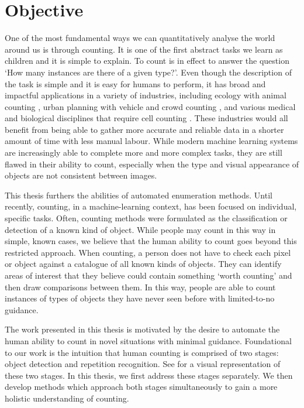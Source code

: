 \documentclass[../thesis.tex]{subfiles}
\begin{document}
\section{Objective}\label{sec__intro__objective}
One of the most fundamental ways we can quantitatively analyse the world around us is through counting. 
It is one of the first abstract tasks we learn as children and it is simple to explain. To count is in effect to answer the question `How many instances are there of a given type?'. 
Even though the description of the task is simple and it is easy for humans to perform, it has broad and impactful applications in a variety of industries, including ecology with animal counting \cite{go2021fine, arteta2016counting}, urban planning with vehicle \cite{arteta2014interactive, Lu18, mundhenk2016large} and crowd counting \cite{wang2011automatic, wang2015deep, marana1997estimation, cao2018scale, barinova2012detection, Lu18}, and various medical and biological disciplines that require cell counting \cite{xie2018microscopy, morelli2021automating}. These industries would all benefit from being able to gather more accurate and reliable data in a shorter amount of time with less manual labour.
While modern machine learning systems are increasingly able to complete more and more complex tasks, they are still flawed in their ability to count, especially when the type and visual appearance of objects are not consistent between images.

This thesis furthers the abilities of automated enumeration methods.
Until recently, counting, in a machine-learning context, has been focused on individual, specific tasks. 
Often, counting methods were formulated as the classification or detection of a known kind of object.
While people may count in this way in simple, known cases, we believe that the human ability to count goes beyond this restricted approach.
When counting, a person does not have to check each pixel or object against a catalogue of all known kinds of objects. 
They can identify areas of interest that they believe could contain something `worth counting' and then draw comparisons between them. 
In this way, people are able to count instances of types of objects they have never seen before with limited-to-no guidance.

The work presented in this thesis is motivated by the desire to automate the human ability to count in novel situations with minimal guidance.
Foundational to our work is the intuition that human counting is comprised of two stages: object detection and repetition recognition.
See  for a visual representation of these two stages.
In this thesis, we first address these stages separately. We then develop methods which approach both stages simultaneously to gain a more holistic understanding of counting.
\end{document}
